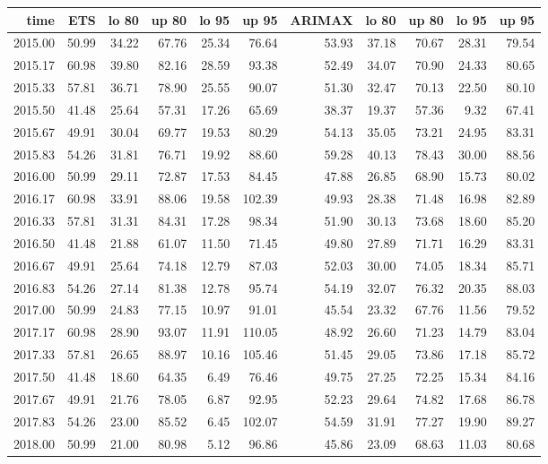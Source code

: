 \documentclass[10pt,a4paper]{article}\usepackage[]{graphicx}\usepackage[]{color}
\begin{document}
\begin{table}[ht]
\centering
\begin{tabular}{rrrrrrrrrrr}
  \hline
time & ETS  & lo 80 & up 80 & lo 95 & up 95 & ARIMAX  & lo 80 & up 80 & lo 95 & up 95 \\ 
  \hline
2015.00 & 50.99 & 34.22 & 67.76 & 25.34 & 76.64 & 53.93 & 37.18 & 70.67 & 28.31 & 79.54 \\ 
  2015.17 & 60.98 & 39.80 & 82.16 & 28.59 & 93.38 & 52.49 & 34.07 & 70.90 & 24.33 & 80.65 \\ 
  2015.33 & 57.81 & 36.71 & 78.90 & 25.55 & 90.07 & 51.30 & 32.47 & 70.13 & 22.50 & 80.10 \\ 
  2015.50 & 41.48 & 25.64 & 57.31 & 17.26 & 65.69 & 38.37 & 19.37 & 57.36 & 9.32 & 67.41 \\ 
  2015.67 & 49.91 & 30.04 & 69.77 & 19.53 & 80.29 & 54.13 & 35.05 & 73.21 & 24.95 & 83.31 \\ 
  2015.83 & 54.26 & 31.81 & 76.71 & 19.92 & 88.60 & 59.28 & 40.13 & 78.43 & 30.00 & 88.56 \\ 
  2016.00 & 50.99 & 29.11 & 72.87 & 17.53 & 84.45 & 47.88 & 26.85 & 68.90 & 15.73 & 80.02 \\ 
  2016.17 & 60.98 & 33.91 & 88.06 & 19.58 & 102.39 & 49.93 & 28.38 & 71.48 & 16.98 & 82.89 \\ 
  2016.33 & 57.81 & 31.31 & 84.31 & 17.28 & 98.34 & 51.90 & 30.13 & 73.68 & 18.60 & 85.20 \\ 
  2016.50 & 41.48 & 21.88 & 61.07 & 11.50 & 71.45 & 49.80 & 27.89 & 71.71 & 16.29 & 83.31 \\ 
  2016.67 & 49.91 & 25.64 & 74.18 & 12.79 & 87.03 & 52.03 & 30.00 & 74.05 & 18.34 & 85.71 \\ 
  2016.83 & 54.26 & 27.14 & 81.38 & 12.78 & 95.74 & 54.19 & 32.07 & 76.32 & 20.35 & 88.03 \\ 
  2017.00 & 50.99 & 24.83 & 77.15 & 10.97 & 91.01 & 45.54 & 23.32 & 67.76 & 11.56 & 79.52 \\ 
  2017.17 & 60.98 & 28.90 & 93.07 & 11.91 & 110.05 & 48.92 & 26.60 & 71.23 & 14.79 & 83.04 \\ 
  2017.33 & 57.81 & 26.65 & 88.97 & 10.16 & 105.46 & 51.45 & 29.05 & 73.86 & 17.18 & 85.72 \\ 
  2017.50 & 41.48 & 18.60 & 64.35 & 6.49 & 76.46 & 49.75 & 27.25 & 72.25 & 15.34 & 84.16 \\ 
  2017.67 & 49.91 & 21.76 & 78.05 & 6.87 & 92.95 & 52.23 & 29.64 & 74.82 & 17.68 & 86.78 \\ 
  2017.83 & 54.26 & 23.00 & 85.52 & 6.45 & 102.07 & 54.59 & 31.91 & 77.27 & 19.90 & 89.27 \\ 
  2018.00 & 50.99 & 21.00 & 80.98 & 5.12 & 96.86 & 45.86 & 23.09 & 68.63 & 11.03 & 80.68 \\ 
   \hline
\end{tabular}
\end{table}
\end{document}
